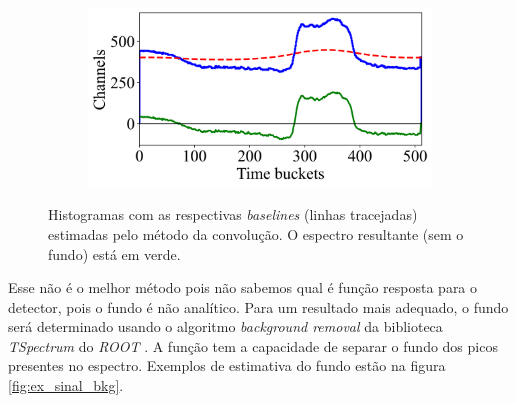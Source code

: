 \documentclass[a4paper,12pt,oneside]{book}
\begin{document}
\begin{figure}[H]
\begin{subfigure}[b]{0.45\textwidth}
        \caption{}
        \label{subfig:bs_fourier_3}
    \end{subfigure}%
    \hfill
    \begin{subfigure}[b]{0.45\textwidth}
        \centering
        \includegraphics[scale=0.45]{figs/bs_fourier_4.png}
        \caption{}
        \label{subfig:bs_fourier_4}
    \end{subfigure}
\caption{Histogramas com as respectivas \textit{baselines} (linhas tracejadas) estimadas pelo método da convolução. O espectro resultante (sem o fundo) está em verde.}
\label{fig:bs_fourier_exs}
\end{figure}


\par Esse não é o melhor método pois não sabemos qual é função resposta para o detector, pois o fundo é não analítico. Para um resultado mais adequado, o fundo será determinado usando o algoritmo \textit{background removal} da biblioteca \textit{TSpectrum} do \textit{ROOT} \cite{root}. A função tem a capacidade de separar o fundo dos picos presentes no espectro\cite{BKG_1, BKG_2, BKG_3}. Exemplos de estimativa do fundo estão na figura \ref{fig:ex_sinal_bkg}.
\end{document}
